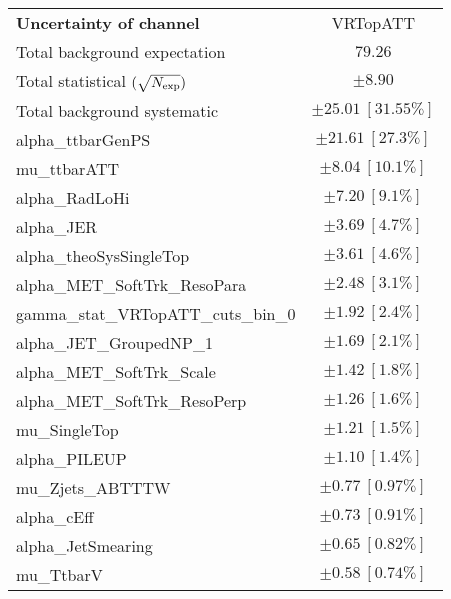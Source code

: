 
\begin{table}
\begin{center}
\setlength{\tabcolsep}{0.0pc}
\begin{tabular*}{\textwidth}{@{\extracolsep{\fill}}lc}
\noalign{\smallskip}\hline\noalign{\smallskip}
{\bf Uncertainty of channel}                                    & VRTopATT            \\
\noalign{\smallskip}\hline\noalign{\smallskip}
Total background expectation             &  $79.26$       \\
\noalign{\smallskip}\hline\noalign{\smallskip}
Total statistical $(\sqrt{N_{\rm exp}})$              & $\pm 8.90$       \\
Total background systematic               & $\pm 25.01\ [31.55\%] $             \\
\noalign{\smallskip}\hline\noalign{\smallskip}
\noalign{\smallskip}\hline\noalign{\smallskip}
alpha\_ttbarGenPS         & $\pm 21.61\ [27.3\%] $       \\
mu\_ttbarATT         & $\pm 8.04\ [10.1\%] $       \\
alpha\_RadLoHi         & $\pm 7.20\ [9.1\%] $       \\
alpha\_JER         & $\pm 3.69\ [4.7\%] $       \\
alpha\_theoSysSingleTop         & $\pm 3.61\ [4.6\%] $       \\
alpha\_MET\_SoftTrk\_ResoPara         & $\pm 2.48\ [3.1\%] $       \\
gamma\_stat\_VRTopATT\_cuts\_bin\_0         & $\pm 1.92\ [2.4\%] $       \\
alpha\_JET\_GroupedNP\_1         & $\pm 1.69\ [2.1\%] $       \\
alpha\_MET\_SoftTrk\_Scale         & $\pm 1.42\ [1.8\%] $       \\
alpha\_MET\_SoftTrk\_ResoPerp         & $\pm 1.26\ [1.6\%] $       \\
mu\_SingleTop         & $\pm 1.21\ [1.5\%] $       \\
alpha\_PILEUP         & $\pm 1.10\ [1.4\%] $       \\
mu\_Zjets\_ABTTTW         & $\pm 0.77\ [0.97\%] $       \\
alpha\_cEff         & $\pm 0.73\ [0.91\%] $       \\
alpha\_JetSmearing         & $\pm 0.65\ [0.82\%] $       \\
mu\_TtbarV         & $\pm 0.58\ [0.74\%] $       \\

\end{tabular*}
\end{center}
\end{table}
